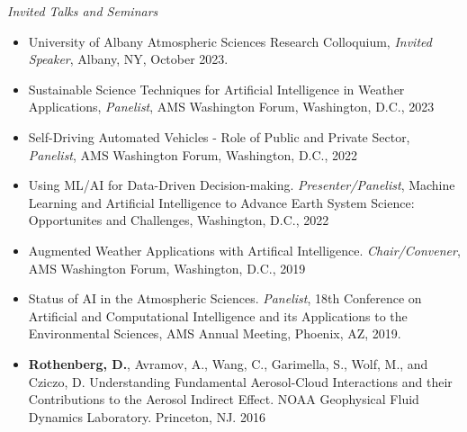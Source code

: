 \documentclass[11pt,letterpaper]{article}
\begin{document}
\emph{Invited Talks and Seminars}
\medskip
\begin{itemize}[itemindent=-10pt]

 \item University of Albany Atmospheric Sciences Research Colloquium, \textit{Invited Speaker}, Albany, NY, October 2023.

 \item Sustainable Science Techniques for Artificial Intelligence in Weather Applications, \textit{Panelist}, AMS Washington Forum, Washington, D.C., 2023

 \item Self-Driving Automated Vehicles - Role of Public and Private Sector, \textit{Panelist}, AMS Washington Forum, Washington, D.C., 2022
 
 \item Using ML/AI for Data-Driven Decision-making. \textit{Presenter/Panelist}, Machine Learning and Artificial Intelligence to Advance Earth System Science: Opportunites and Challenges, Washington, D.C., 2022
 
 \item Augmented Weather Applications with Artifical Intelligence. \textit{Chair/Convener}, AMS Washington Forum, Washington, D.C., 2019

 \item Status of AI in the Atmospheric Sciences. \textit{Panelist}, 18th Conference on Artificial and Computational Intelligence and its Applications to the Environmental Sciences, AMS Annual Meeting, Phoenix, AZ, 2019.
  
 \item \textbf{Rothenberg, D.}, Avramov, A., Wang, C., Garimella, S., Wolf, M., and Cziczo, D. Understanding Fundamental Aerosol-Cloud Interactions and their Contributions to the Aerosol Indirect Effect. NOAA Geophysical Fluid Dynamics Laboratory. Princeton, NJ. 2016
\end{itemize}
\end{document}
